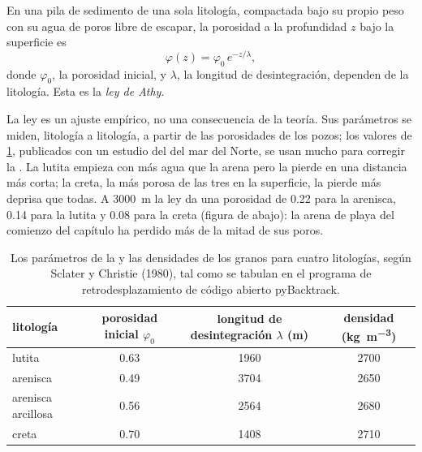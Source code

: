 \begin{proposition}\label{prop:b1:diagenesis-basins:athy}
En una pila de sedimento de una sola litología, compactada bajo su propio peso con su agua de poros libre de escapar, la porosidad a la profundidad $z$ bajo la superficie es
\[
  \varphi(z) = \varphi_0\, e^{-z/\lambda},
\]
donde $\varphi_0$, la porosidad inicial, y $\lambda$, la longitud de desintegración, dependen de la litología. Esta es la \emph{ley de Athy}.
\end{proposition}
\admitted

La ley es un ajuste empírico, no una consecuencia de la teoría. Sus parámetros se miden, litología a litología, a partir de las porosidades de los pozos; los valores de
\cref{tab:b1:diagenesis-basins:athy}, publicados con un estudio del  del mar del Norte, se usan mucho para corregir la . La lutita empieza con más agua que la arena
pero la pierde en una distancia más corta; la creta, la más porosa de las tres en la superficie, la pierde más deprisa que todas. A \qty{3000}{m} la ley da una porosidad de
\num{0.22} para la arenisca, \num{0.14} para la lutita y \num{0.08} para la creta (figura de abajo): la arena de playa del comienzo del capítulo ha perdido más de la mitad de sus poros.

\begin{table}[htbp]
\centering
\begin{tabular}{lccc}
\hline
litología & porosidad inicial $\varphi_0$ & longitud de desintegración $\lambda$ (m) & densidad (\unit{kg.m^{-3}}) \\
\hline
lutita            & 0.63 & 1960 & 2700 \\
arenisca        & 0.49 & 3704 & 2650 \\
arenisca arcillosa  & 0.56 & 2564 & 2680 \\
creta            & 0.70 & 1408 & 2710 \\
\hline
\end{tabular}
\caption{Los parámetros de la  y las densidades de los granos para cuatro litologías, según Sclater y Christie (1980), tal como se tabulan en el programa de
retrodesplazamiento de código abierto pyBacktrack.}
\label{tab:b1:diagenesis-basins:athy}
\end{table}

